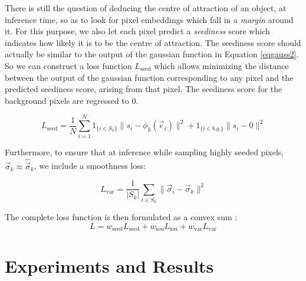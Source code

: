 \documentclass{midl} %
\begin{document}
There is still the question of deducing the centre of attraction of an object, at inference time, so as to look for pixel embeddings which fall in a \emph{margin} around it. For this purpose, we also let each pixel predict a \emph{seediness} score which indicates how likely it is to be the centre of attraction. The seediness score should actually be similar to the output of the gaussian function in Equation \eqref{eqgauss2}. So we can construct a loss function $L_{\text{seed}}$ which allows minimizing the distance between the output of the gaussian function corresponding to any pixel and the predicted seediness score, arising from that pixel. The seediness score for the background pixels are regressed to 0.

\begin{equation}
    L_{\text{seed}}=\frac{1}{N} \sum_{i=1}^{N} 1_{\{i \in S_{k}\}} \lVert s_{i} - \phi_{k} (\vec{e}_{i}) \rVert^{2} +  1_{\{i \in b.g.\}} \lVert s_{i} - 0 \rVert^{2}
    \label{eqseed}
\end{equation}

Furthermore, to ensure that at inference while sampling highly seeded pixels, $\vec{\sigma}_{k} \approx \hat{\vec{\sigma}}_{k}$, we include a smoothness loss:


\begin{equation}
    L_{\text{var}}= \frac{1}{\vert S_{k} \vert}\sum_{i \in S_{k}} \lVert \vec{\sigma}_{i} - \vec{\sigma}_{k} \rVert^{2}
    \label{eqvar}
\end{equation}

The complete loss function is then formulated as a convex sum :
\begin{equation}
L = w_{\text{seed}} L_{\text{seed}} + w_{\text{iou}} L_{\text{iou}} + w_{\text{var}} L_{\text{var}}
\end{equation}

\section{Experiments and Results}
\resultsTwoDimensional
\resultsThreeDimensional
\threeDimensionalDataDescription
\end{document}
